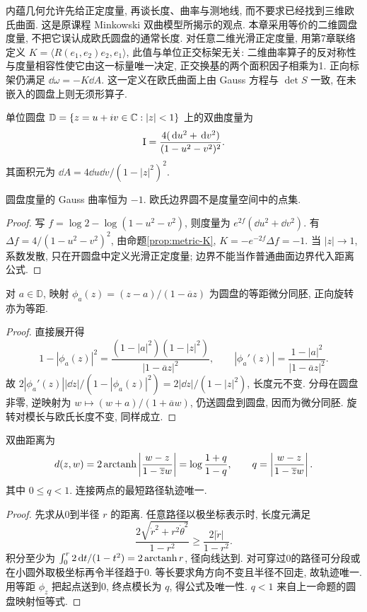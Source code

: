 内蕴几何允许先给正定度量, 再谈长度、曲率与测地线, 而不要求已经找到三维欧氏曲面. 这是原课程 Minkowski 双曲模型所揭示的观点. 本章采用等价的二维圆盘度量, 不把它误认成欧氏圆盘的通常长度. 对任意二维光滑正定度量, 用第7章联络定义 $K=\langle R(e_1,e_2)e_2,e_1\rangle$, 此值与单位正交标架无关: 二维曲率算子的反对称性与度量相容性使它由这一标量唯一决定, 正交换基的两个面积因子相乘为1. 正向标架仍满足 $\dd\omega=-K\dd A$. 这一定义在欧氏曲面上由 Gauss 方程与 $\det S$ 一致, 在未嵌入的圆盘上则无须形算子.
\begin{definition}
单位圆盘 $\mathbb D=\{z=u+iv\in\mathbb C:|z|<1\}$ 上的双曲度量为
\[
 \mathrm{I}=\frac{4(\,\mathrm d u^2+\,\mathrm d v^2)}{(1-u^2-v^2)^2}.
\]
其面积元为 $\dd A=4\dd u\dd v/(1-|z|^2)^2$.
\end{definition}
\begin{proposition}\label{prop:hyperbolic-K}
圆盘度量的 Gauss 曲率恒为 $-1$. 欧氏边界圆不是度量空间中的点集.
\end{proposition}
\begin{proof}
写 $f=\log2-\log(1-u^2-v^2)$, 则度量为 $e^{2f}(\dd u^2+\dd v^2)$. 有 $\Delta f=4/(1-u^2-v^2)^2$, 由命题\ref{prop:metric-K}, $K=-e^{-2f}\Delta f=-1$. 当 $|z|\to1$, 系数发散, 只在开圆盘中定义光滑正定度量; 边界不能当作普通曲面边界代入距离公式.
\end{proof}
\begin{proposition}\label{prop:disk-isometry}
对 $a\in\mathbb D$, 映射 $\phi_a(z)=(z-a)/(1-\overline a z)$ 为圆盘的等距微分同胚, 正向旋转亦为等距.
\end{proposition}
\begin{proof}
直接展开得
\[
 1-|\phi_a(z)|^2=\frac{(1-|a|^2)(1-|z|^2)}{|1-\overline a z|^2},\qquad
 |\phi_a'(z)|=\frac{1-|a|^2}{|1-\overline a z|^2}.
\]
故 $2|\phi_a'(z)||\dd z|/(1-|\phi_a(z)|^2)=2|\dd z|/(1-|z|^2)$, 长度元不变. 分母在圆盘非零, 逆映射为 $w\mapsto(w+a)/(1+\overline a w)$, 仍送圆盘到圆盘, 因而为微分同胚. 旋转对模长与欧氏长度不变, 同样成立.
\end{proof}
\begin{theorem}\label{thm:hyperbolic-distance}
双曲距离为
\begin{equation}\label{eq:disk-distance}
 d(z,w)=2\operatorname{arctanh}\left|\frac{w-z}{1-\overline z w}\right|
 =\log\frac{1+q}{1-q},\qquad q=\left|\frac{w-z}{1-\overline z w}\right|.
\end{equation}
其中 $0\le q<1$. 连接两点的最短路径轨迹唯一.
\end{theorem}
\begin{proof}
先求从0到半径 $r$ 的距离. 任意路径以极坐标表示时, 长度元满足
\[
 \frac{2\sqrt{\dot r^2+r^2\dot\theta^2}}{1-r^2}\ge\frac{2|\dot r|}{1-r^2}.
\]
积分至少为 $\int_0^r2\,\mathrm d t/(1-t^2)=2\operatorname{arctanh} r$, 径向线达到. 对可穿过0的路径可分段或在小圆外取极坐标再令半径趋于0. 等长要求角方向不变且半径不回走, 故轨迹唯一. 用等距 $\phi_z$ 把起点送到0, 终点模长为 $q$, 得公式及唯一性. $q<1$ 来自上一命题的圆盘映射恒等式.
\end{proof}
